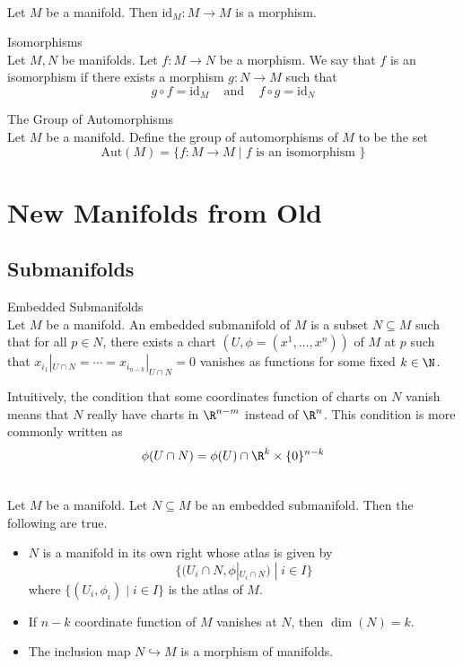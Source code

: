 \documentclass[a4paper]{article}
\begin{document}
\begin{lmm}{}{}\\
Let $M$ be a manifold. Then $\text{id}_M:M\to M$ is a morphism. 
\end{lmm}

\begin{defn}{Isomorphisms}{}\\
Let $M,N$ be manifolds. Let $f:M\to N$ be a morphism. We say that $f$ is an isomorphism if there exists a morphism $g:N\to M$ such that $$g\circ f=\text{id}_M\;\;\;\text{ and }\;\;\;f\circ g=\text{id}_N$$
\end{defn}

\begin{defn}{The Group of Automorphisms}{}\\
Let $M$ be a manifold. Define the group of automorphisms of $M$ to be the set $$\text{Aut}(M)=\{f:M\to M\;|\;f\text{ is an isomorphism }\}$$
\end{defn}



\pagebreak
\section{New Manifolds from Old}
\subsection{Submanifolds}
\begin{defn}{Embedded Submanifolds}{}\\
Let $M$ be a manifold. An embedded submanifold of $M$ is a subset $N\subseteq M$ such that for all $p\in N$, there exists a chart $(U,\phi=(x^1,\dots,x^n))$ of $M$ at $p$ such that $x_{i_1}|_{U\cap N}=\cdots=x_{i_{n-k}}|_{U\cap N}=0$ vanishes as functions for some fixed $k\in\N$. 
\end{defn}

Intuitively, the condition that some coordinates function of charts on $N$ vanish means that $N$ really have charts in $\R^{n-m}$ instead of $\R^n$. This condition is more commonly written as $$\phi(U\cap N)=\phi(U)\cap\R^k\times\{0\}^{n-k}$$

\begin{prp}{}{}\\
Let $M$ be a manifold. Let $N\subseteq M$ be an embedded submanifold. Then the following are true. 
\begin{itemize}
\item $N$ is a manifold in its own right whose atlas is given by $$\{(U_i\cap N,\phi|_{U_i\cap N})\;|\;i\in I\}$$ where $\{(U_i,\phi_i)\;|\;i\in I\}$ is the atlas of $M$. 
\item If $n-k$ coordinate function of $M$ vanishes at $N$, then $\dim(N)=k$. 
\item The inclusion map $N\hookrightarrow M$ is a morphism of manifolds. 
\end{itemize}
\end{prp}
\end{document}
